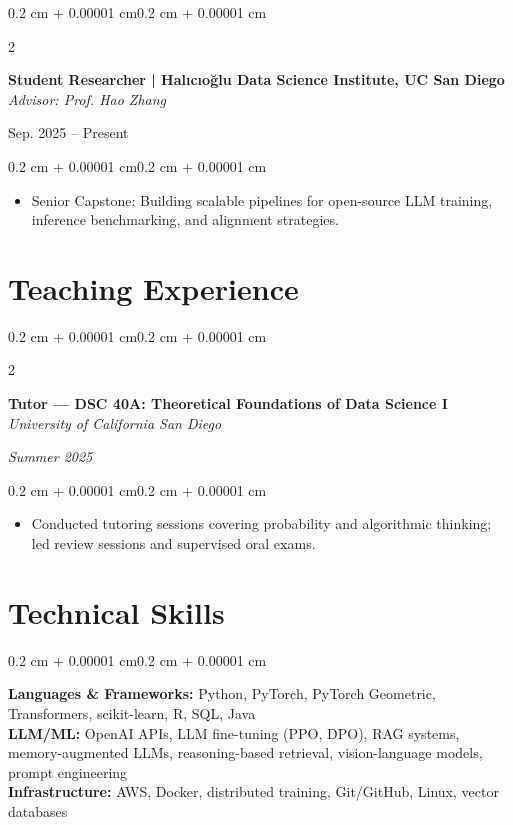 \documentclass[10pt, letterpaper]{article}
\newenvironment{highlights}{
    \begin{itemize}[
        topsep=0.06 cm,
        parsep=0.06 cm,
        partopsep=0pt,
        itemsep=0pt,
        leftmargin=0.4 cm + 10pt
    ]
}{\end{itemize}}
\newenvironment{onecolentry}{
    \begin{adjustwidth}{0.2 cm + 0.00001 cm}{0.2 cm + 0.00001 cm}
}{\end{adjustwidth}}
\newenvironment{twocolentry}[2][]{
    \onecolentry
    \def\secondColumn{#2}
    \setcolumnwidth{\fill, 4.5 cm}
    \begin{paracol}{2}
}{
    \switchcolumn \raggedleft \secondColumn
    \end{paracol}
    \endonecolentry
}
\begin{document}
    \begin{twocolentry}{Sep. 2025 -- Present}
        \textbf{Student Researcher | Halıcıo\u{g}lu Data Science Institute, UC San Diego}\\
        \textit{Advisor: Prof. Hao Zhang}
    \end{twocolentry}
    \vspace{0.06 cm}
    \begin{onecolentry}
        \begin{highlights}
            \item Senior Capstone: Building scalable pipelines for open-source LLM training, inference benchmarking, and alignment strategies.
        \end{highlights}
    \end{onecolentry}

    \section{Teaching Experience}

    \begin{twocolentry}{\textit{Summer 2025}}
        \textbf{Tutor --- DSC 40A: Theoretical Foundations of Data Science I}\\
        \textit{University of California San Diego}
    \end{twocolentry}
    \vspace{0.06 cm}
    \begin{onecolentry}
        \begin{highlights}
            \item Conducted tutoring sessions covering probability and algorithmic thinking; led review sessions and supervised oral exams.
        \end{highlights}
    \end{onecolentry}

    \section{Technical Skills}

    \begin{onecolentry}
        \textbf{Languages \& Frameworks:} Python, PyTorch, PyTorch Geometric, Transformers, scikit-learn, R, SQL, Java\\[2pt]
        \textbf{LLM/ML:} OpenAI APIs, LLM fine-tuning (PPO, DPO), RAG systems, memory-augmented LLMs, reasoning-based retrieval, vision-language models, prompt engineering\\[2pt]
        \textbf{Infrastructure:} AWS, Docker, distributed training, Git/GitHub, Linux, vector databases
    \end{onecolentry}
\end{document}
